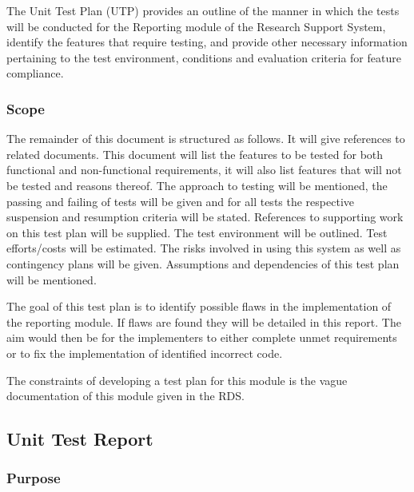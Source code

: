 The Unit Test Plan (UTP) provides an outline of the manner in which the tests will be conducted for the Reporting module of the Research Support System, identify the features that require testing, and provide other necessary information pertaining to the test environment, conditions and evaluation criteria for feature compliance.
 
\subsubsection{Scope}
The remainder of this document is structured as follows. It will give references to related documents. This document will list the features to be tested for both functional and non-functional requirements, it will also list features that will not be tested and reasons thereof. The approach to testing will be mentioned, the passing and failing of tests will be given and for all tests the respective suspension and resumption criteria will be stated. References to supporting work on this test plan will be supplied. The test environment will be outlined. Test efforts/costs will be estimated. The risks involved in using this system as well as contingency plans will be given. Assumptions and dependencies of this test plan will be mentioned.
\par The goal of this test plan is to identify possible flaws in the implementation of the reporting module. If flaws are found they will be detailed in this report. The aim would then be for the implementers to either complete unmet requirements or to fix the implementation of identified incorrect code.	
\par The constraints of developing a test plan for this module is the vague documentation of this module given in the RDS. 


\subsection{Unit Test Report}
\subsubsection{Purpose}

